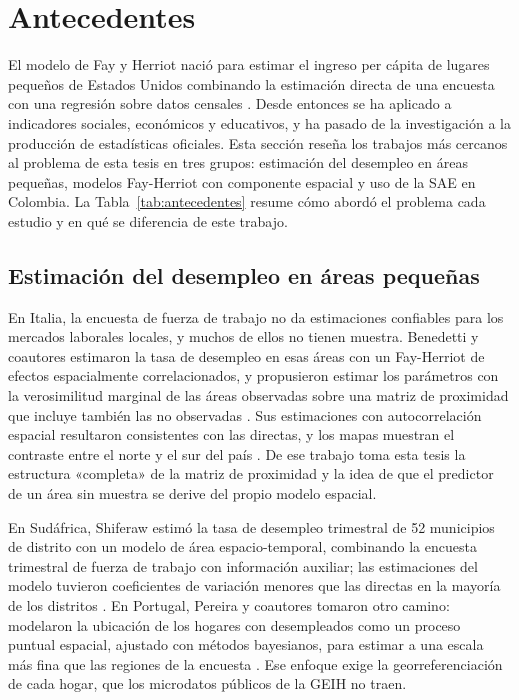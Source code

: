 

\section{Antecedentes}
\label{sec:antecedentes}

El modelo de Fay y Herriot nació para estimar el ingreso per cápita de lugares pequeños de Estados Unidos combinando la estimación directa de una encuesta con una regresión sobre datos censales \cite{FayHerriot1979}. Desde entonces se ha aplicado a indicadores sociales, económicos y educativos, y ha pasado de la investigación a la producción de estadísticas oficiales. Esta sección reseña los trabajos más cercanos al problema de esta tesis en tres grupos: estimación del desempleo en áreas pequeñas, modelos Fay-Herriot con componente espacial y uso de la SAE en Colombia. La Tabla~\ref{tab:antecedentes} resume cómo abordó el problema cada estudio y en qué se diferencia de este trabajo.

\subsection{Estimación del desempleo en áreas pequeñas}

En Italia, la encuesta de fuerza de trabajo no da estimaciones confiables para los mercados laborales locales, y muchos de ellos no tienen muestra. Benedetti y coautores estimaron la tasa de desempleo en esas áreas con un Fay-Herriot de efectos espacialmente correlacionados, y propusieron estimar los parámetros con la verosimilitud marginal de las áreas observadas sobre una matriz de proximidad que incluye también las no observadas \cite[pp.~140--142, 146--149]{Benedetti2024}. Sus estimaciones con autocorrelación espacial resultaron consistentes con las directas, y los mapas muestran el contraste entre el norte y el sur del país \cite[p.~156]{Benedetti2024}. De ese trabajo toma esta tesis la estructura «completa» de la matriz de proximidad y la idea de que el predictor de un área sin muestra se derive del propio modelo espacial.

En Sudáfrica, Shiferaw estimó la tasa de desempleo trimestral de 52 municipios de distrito con un modelo de área espacio-temporal, combinando la encuesta trimestral de fuerza de trabajo con información auxiliar; las estimaciones del modelo tuvieron coeficientes de variación menores que las directas en la mayoría de los distritos \cite[pp.~4, 19, 30]{Shiferaw2025}. En Portugal, Pereira y coautores tomaron otro camino: modelaron la ubicación de los hogares con desempleados como un proceso puntual espacial, ajustado con métodos bayesianos, para estimar a una escala más fina que las regiones de la encuesta \cite[pp.~1--2, 12]{Pereira2021}. Ese enfoque exige la georreferenciación de cada hogar, que los microdatos públicos de la GEIH no traen.


